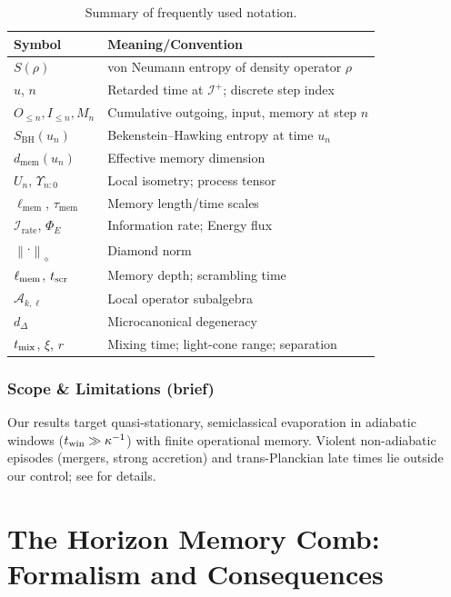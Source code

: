\documentclass[11pt,a4paper]{article}
\newcommand{\normD}[1]{\left\lVert #1 \right\rVert_{\diamond}}
\newcommand{\Irate}{\mathcal{I}_{\mathrm{rate}}}
\newcommand{\Eflux}{\Phi_E}
\newcommand{\Ddiamond}[1]{\normD{#1}}
\newcommand{\dmem}{\ensuremath{d_{\mathrm{mem}}}}
\newcommand{\ellmem}{\ensuremath{\ell_{\mathrm{mem}}}}
\newcommand{\taumem}{\ensuremath{\tau_{\mathrm{mem}}}}
\theoremstyle{plain}
\theoremstyle{definition}
\theoremstyle{remark}
\begin{document}
\begin{table}[hbtp]
\centering
\caption{Summary of frequently used notation.}
\label{tab:notation_summary}
\small
\begin{tabular*}{\textwidth}{@{\extracolsep{\fill}}ll@{}}
\toprule
\textbf{Symbol} & \textbf{Meaning/Convention} \\
\midrule
\(S(\rho)\) & von Neumann entropy of density operator \(\rho\) \\
\(u\), \(n\) & Retarded time at \(\mathcal{I}^+\); discrete step index \\
\(O_{\le n}, I_{\le n}, M_n\) & Cumulative outgoing, input, memory at step \(n\) \\
\(S_{\mathrm{BH}}(u_n)\) & Bekenstein--Hawking entropy at time \(u_n\) \\
\(\dmem(u_n)\) & Effective memory dimension \\
\(U_n\), \(\Upsilon_{n{:}0}\) & Local isometry; process tensor \\
\(\ellmem\), \(\taumem\) & Memory length/time scales \\
\(\Irate\), \(\Eflux\) & Information rate; Energy flux \\
\(\Ddiamond{\cdot}\) & Diamond norm \\
\(\ell_{\rm mem}\), \(t_{\rm scr}\) & Memory depth; scrambling time \\
\(\mathscr{A}_{k,\ell}\) & Local operator subalgebra \\
\(d_\Delta\) & Microcanonical degeneracy \\
\(t_{\rm mix}\), \(\xi\), \(r\) & Mixing time; light-cone range; separation \\
\bottomrule
\end{tabular*}
\end{table}


\subsubsection{Scope \& Limitations (brief)} Our results target quasi-stationary, semiclassical evaporation in adiabatic windows ($t_{\rm win}\gg \kappa^{-1}$) with finite operational memory. Violent non-adiabatic episodes (mergers, strong accretion) and trans-Planckian late times lie outside our control; see  for details.
\section{The Horizon Memory Comb: Formalism and Consequences}
\label{sec:formalism_consequences}
\end{document}
